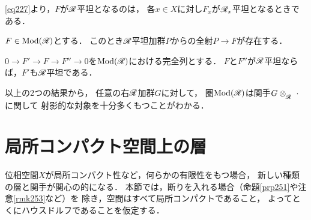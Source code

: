 \eqref{eq227}より，\(F\)が\(\mathscr{R}\)平坦となるのは，
各\(x\in X\)に対し\(F_{x}\)が\(\mathscr{R}_{x}\)平坦となるときである．

\begin{leftbar}
\begin{PRP}\label{PRP2412}
    \(F\in\mathop{\mathrm{Mod}}\nolimits(\mathscr{R})\)とする．
    このとき\(\mathscr{R}\)平坦加群\(P\)からの全射\(P\to F\)が存在する．
\end{PRP}
\end{leftbar}

\begin{leftbar}
\begin{PRP}\label{PRP2413}
    \(0\to F'\to F\to F''\to0\)を\(\mathop{\mathrm{Mod}}\nolimits(\mathscr{R})\)における完全列とする．
    \(F\)と\(F''\)が\(\mathscr{R}\)平坦ならば，\(F'\)も\(\mathscr{R}\)平坦である．
\end{PRP}
\end{leftbar}

以上の2つの結果から，
任意の右\(\mathscr{R}\)加群\(G\)に対して，
圏\(\mathop{\mathrm{Mod}}\nolimits(\mathscr{R})\)は関手\(G\ttens[\scR]\blk\)に関して
射影的な対象を十分多くもつことがわかる．






\section{局所コンパクト空間上の層}
位相空間\(X\)が局所コンパクト性など，何らかの有限性をもつ場合，
新しい種類の層と関手が関心の的になる．
本節では，断りを入れる場合（命題\ref{prp251}や注意\ref{rmk253}など）を
除き，空間はすべて局所コンパクトであること，
よってとくにハウスドルフであることを仮定する．

